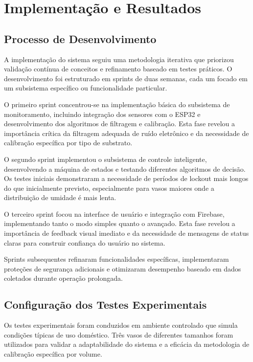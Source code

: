 \chapter{Implementação e Resultados}

\section{Processo de Desenvolvimento}

A implementação do sistema seguiu uma metodologia iterativa que priorizou validação contínua de conceitos e refinamento baseado em testes práticos. O desenvolvimento foi estruturado em sprints de duas semanas, cada um focado em um subsistema específico ou funcionalidade particular.

O primeiro sprint concentrou-se na implementação básica do subsistema de monitoramento, incluindo integração dos sensores com o ESP32 e desenvolvimento dos algoritmos de filtragem e calibração. Esta fase revelou a importância crítica da filtragem adequada de ruído eletrônico e da necessidade de calibração específica por tipo de substrato.

O segundo sprint implementou o subsistema de controle inteligente, desenvolvendo a máquina de estados e testando diferentes algoritmos de decisão. Os testes iniciais demonstraram a necessidade de períodos de lockout mais longos do que inicialmente previsto, especialmente para vasos maiores onde a distribuição de umidade é mais lenta.

O terceiro sprint focou na interface de usuário e integração com Firebase, implementando tanto o modo simples quanto o avançado. Esta fase revelou a importância de feedback visual imediato e da necessidade de mensagens de status claras para construir confiança do usuário no sistema.

Sprints subsequentes refinaram funcionalidades específicas, implementaram proteções de segurança adicionais e otimizaram desempenho baseado em dados coletados durante operação prolongada.

\section{Configuração dos Testes Experimentais}

Os testes experimentais foram conduzidos em ambiente controlado que simula condições típicas de uso doméstico. Três vasos de diferentes tamanhos foram utilizados para validar a adaptabilidade do sistema e a eficácia da metodologia de calibração específica por volume.

